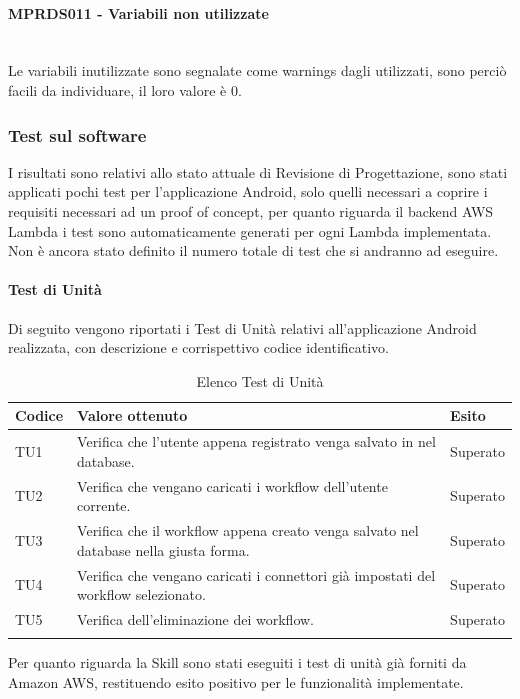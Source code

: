 \paragraph{MPRDS011 - Variabili non utilizzate}\mbox{}\\[0.4cm]
Le variabili inutilizzate sono segnalate come warnings dagli  utilizzati, sono perciò facili da individuare, il loro valore è 0.
\subsubsection{Test sul software}
I risultati sono relativi allo stato attuale di Revisione di Progettazione, sono stati applicati pochi test per l'applicazione Android, solo quelli necessari a coprire i requisiti necessari ad un proof of concept, per quanto riguarda il backend AWS Lambda i test sono automaticamente generati per ogni Lambda implementata. Non è ancora stato definito il numero totale di test che si andranno ad eseguire.
\paragraph{Test di Unità}
\label{sec:tuRP}
Di seguito vengono riportati i Test di Unità relativi all'applicazione Android realizzata, con descrizione e corrispettivo codice identificativo.
\begin{center}
	\centering
	\renewcommand{\arraystretch}{1.5}
	\begin{longtable}{  p{1.5cm}  p{10.5cm} p{2cm}  }
		\rowcolor{tableHeadYellow}
		\textbf{Codice}   & \textbf{Valore ottenuto} & \textbf{Esito} \\ 
		\endhead
		TU1 & Verifica che l’utente appena registrato venga salvato in nel database.  & Superato \\
		TU2 & Verifica che vengano caricati i workflow dell’utente corrente. & Superato \\
		TU3 & Verifica che il workflow appena creato venga salvato nel database nella giusta forma. & Superato \\
		TU4 & Verifica che vengano caricati i connettori già impostati del workflow selezionato. & Superato \\
		TU5 & Verifica dell’eliminazione dei workflow. & Superato \\
		\rowcolor{white}
		\caption{Elenco Test di Unità}
	\end{longtable}
\end{center}
Per quanto riguarda la Skill sono stati eseguiti i test di unità già forniti da Amazon AWS, restituendo esito positivo per le funzionalità implementate.
\pagebreak
